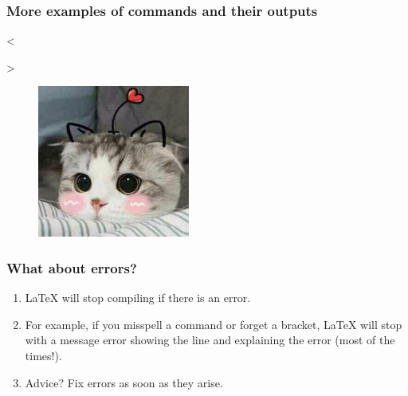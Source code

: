 \documentclass{beamer}
\def\openesc{\color{blue}}
\def\closeesc{\color{black}}
\def\vbdelim{\catcode`<=\active\catcode`>=\active%
\def<{\openesc}
\def>{\closeesc}}
\begin{document}
\begin{frame}[fragile]
\frametitle{More examples of commands and their outputs}
\begin{framed}
\begin{minipage}[b]{.4\textwidth}
  \begin{verbnobox}[\vbdelim]
<>
\end{verbnobox}
\end{minipage}%
\end{framed}
\begin{framed}
\begin{minipage}[b]{.1\textwidth}
\begin{figure}
\includegraphics[width=50mm]{figures/cat.jpeg}
\end{figure}
\end{minipage}
\end{framed}
\end{frame}


\begin{frame}[fragile] %
\frametitle{What about errors? }
\begin{enumerate}
\item \LaTeX{} will stop compiling if there is an error. 
\item For example, if you misspell a command or forget a bracket, \LaTeX{} will stop with a message error showing the line and explaining the error (most of the times!).
\item Advice? Fix errors as soon as they arise.
\end{enumerate}
\end{frame}
\end{document}

